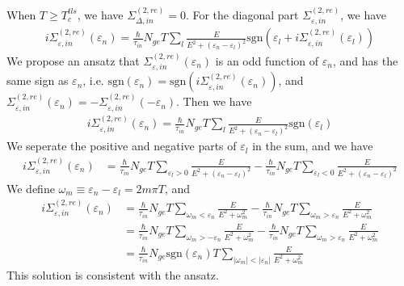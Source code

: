 \documentclass[]{article}
\begin{document}
When $T \geq T_c^{tls}$, we have $\Sigma_{\Delta,in}^{(2,re)} = 0$.
For the diagonal part $\Sigma_{\varepsilon,in}^{(2,re)}$, we have
\begin{align}\label{eq:diagonal_normal}
    i\Sigma_{\varepsilon,in}^{(2,re)}(\varepsilon_n)
    = \frac{\hbar}{\tau_{in}}N_{ge}T\sum_l\frac{E}{E^2+(\varepsilon_n-\varepsilon_l)^2}
    \text{sgn}\left(\varepsilon_l + i\Sigma_{\varepsilon,in}^{(2,re)}(\varepsilon_l)\right)
\end{align}
We propose an ansatz that $\Sigma_{\varepsilon,in}^{(2,re)}(\varepsilon_n)$
is an odd function of $\varepsilon_n$, and has the same sign as $\varepsilon_n$, i.e.
$\text{sgn}(\varepsilon_n) = \text{sgn}\left(i\Sigma_{\varepsilon,in}^{(2,re)}(\varepsilon_n)\right)$, and
$\Sigma_{\varepsilon,in}^{(2,re)}(\varepsilon_n) = -\Sigma_{\varepsilon,in}^{(2,re)}(-\varepsilon_n)$.
Then we have
\begin{align}
    i\Sigma_{\varepsilon,in}^{(2,re)}(\varepsilon_n)
    = \frac{\hbar}{\tau_{in}}N_{ge}T\sum_l\frac{E}{E^2+(\varepsilon_n-\varepsilon_l)^2}\text{sgn}(\varepsilon_l)
\end{align}
We seperate the positive and negative parts of $\varepsilon_l$ in the sum, and we have
\begin{align}
    i\Sigma_{\varepsilon,in}^{(2,re)}(\varepsilon_n)
    & = \frac{\hbar}{\tau_{in}}N_{ge}T\sum_{\varepsilon_l > 0}\frac{E}{E^2+(\varepsilon_n-\varepsilon_l)^2}
    - \frac{\hbar}{\tau_{in}}N_{ge}T\sum_{\varepsilon_l < 0}\frac{E}{E^2+(\varepsilon_n-\varepsilon_l)^2}
\end{align}
We define $\omega_m \equiv \varepsilon_n - \varepsilon_l = 2m\pi T$, and
\begin{align}
    i\Sigma_{\varepsilon,in}^{(2,re)}(\varepsilon_n)
    & = \frac{\hbar}{\tau_{in}}N_{ge}T\sum_{\omega_m < \varepsilon_n}\frac{E}{E^2+\omega_m^2}
    - \frac{\hbar}{\tau_{in}}N_{ge}T\sum_{\omega_m > \varepsilon_n}\frac{E}{E^2+\omega_m^2}\\
    & = \frac{\hbar}{\tau_{in}}N_{ge}T\sum_{\omega_m > -\varepsilon_n}\frac{E}{E^2+\omega_m^2}
    - \frac{\hbar}{\tau_{in}}N_{ge}T\sum_{\omega_m > \varepsilon_n}\frac{E}{E^2+\omega_m^2}\\
    & = \frac{\hbar}{\tau_{in}}N_{ge}\text{sgn}(\varepsilon_n)T
    \sum_{|\omega_m|<|\varepsilon_n|}\frac{E}{E^2+\omega_m^2} \label{eq:diagonal}
\end{align}
This solution is consistent with the ansatz.
\end{document}
